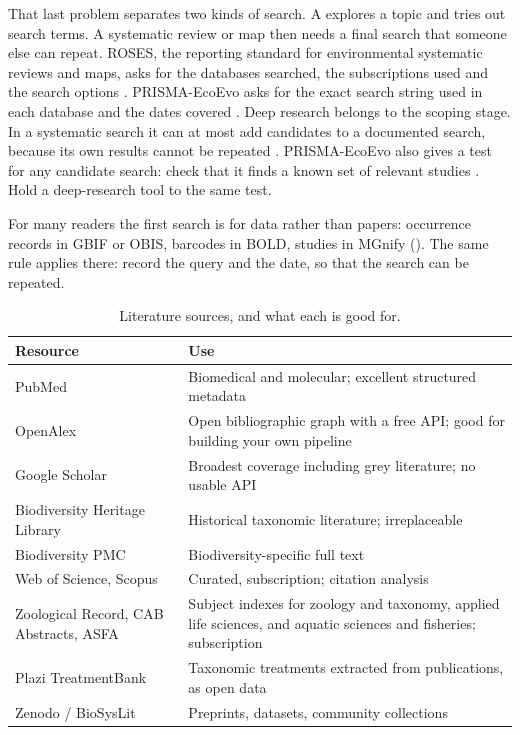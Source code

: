 That last problem separates two kinds of search. A 
explores a topic and tries out search terms. A systematic review or map then
needs a final search that someone else can repeat. ROSES, the reporting
standard for environmental systematic reviews and maps, asks for the databases
searched, the subscriptions used and the search options
\parencite{haddaway2018roses}. PRISMA-EcoEvo asks for the exact search string
used in each database and the dates covered \parencite{odea2021prismaecoevo}.
Deep research belongs to the scoping stage. In a systematic search it can at
most add candidates to a documented search, because its own results cannot be
repeated \parencite{bergertal2024evidence}. PRISMA-EcoEvo also gives a test
for any candidate search: check that it finds a known set of relevant studies
\parencite{odea2021prismaecoevo}. Hold a deep-research tool to the same test.

For many readers the first search is for data rather than papers: occurrence
records in GBIF or OBIS, barcodes in BOLD, studies in MGnify
(). The same rule applies there: record the query and the
date, so that the search can be repeated.

\begin{table}[htbp]
\centering
\caption{Literature sources, and what each is good for.}
\label{tab:literature}
\small
\begin{tabularx}{\textwidth}{lX}
\toprule
\textbf{Resource} & \textbf{Use} \\
\midrule
PubMed & Biomedical and molecular; excellent structured metadata \\
OpenAlex & Open bibliographic graph with a free API; good for building your own pipeline \\
Google Scholar & Broadest coverage including grey literature; no usable API \\
Biodiversity Heritage Library & Historical taxonomic literature; irreplaceable \\
Biodiversity PMC & Biodiversity-specific full text \parencite{pasche2026biodivpmc} \\
Web of Science, Scopus & Curated, subscription; citation analysis \\
Zoological Record, CAB Abstracts, ASFA & Subject indexes for zoology and taxonomy, applied life sciences, and aquatic sciences and fisheries; subscription \\
Plazi TreatmentBank & Taxonomic treatments extracted from publications, as open data \parencite{agosti2022treatments} \\
Zenodo / BioSysLit & Preprints, datasets, community collections \\
\bottomrule
\end{tabularx}
\end{table}

